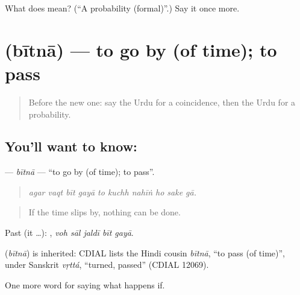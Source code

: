 \begin{tcolorbox}[breakable,colback=teal!4,colframe=teal!35!black,title={Before you move on}]
What does  mean? (\textquotedblleft{}A probability (formal)\textquotedblright{}.) Say it once more.
\end{tcolorbox}
\section[\texorpdfstring{\ur{بیتنا} (bītnā)}{بیتنا (bītnā)}]{ (bītnā) — to go by (of time); to pass}

\label{lesson:UR-C361-bitna}



\begin{quote}
Before the new one: say the Urdu for a coincidence, then the Urdu for a probability.
\end{quote}

\subsection*{You'll want to know: }
\textbf{} — \emph{bītnā} — \textquotedblleft{}to go by (of time); to pass\textquotedblright{}.

\begin{quote}
         
\end{quote}

\begin{quote}
\emph{agar vaqt bīt gayā to kuchh nahīṅ ho sake gā.}
\end{quote}

\begin{quote}
If the time slips by, nothing can be done.
\end{quote}

Past (it …):     , \emph{voh sāl jaldī bīt gayā}.

\begin{cousinweb}
\textbf{} (\emph{bītnā}) is inherited: CDIAL lists the Hindi cousin \emph{bītnā}, \textquotedblleft{}to pass (of time)\textquotedblright{}, under Sanskrit \emph{vṛttá}, \textquotedblleft{}turned, passed\textquotedblright{} (CDIAL 12069).
\end{cousinweb}

\begin{grammarlens}[title={What you've built}]
One more word for saying what happens if.
\end{grammarlens}

